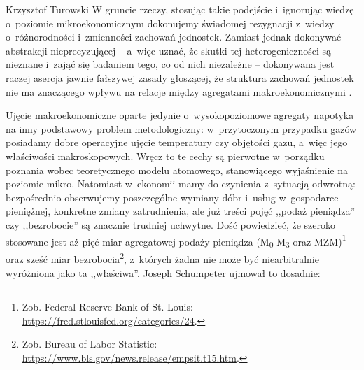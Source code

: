 \begin{artplenv}{Krzysztof Turowski}
W gruncie rzeczy, stosując takie podejście i~ignorując wiedzę o~poziomie mikroekonomicznym dokonujemy świadomej
rezygnacji z~wiedzy o~różnorodności i~zmienności zachowań jednostek. Zamiast jednak dokonywać abstrakcji
nieprecyzującej  --  a~więc uznać, że skutki tej heterogeniczności są nieznane i~zająć się badaniem tego, co od
nich niezależne  --  dokonywana jest raczej asercja jawnie fałszywej zasady głoszącej, że struktura zachowań
jednostek nie ma znaczącego wpływu na relacje między agregatami makroekonomicznymi
\parencite{long_realism_2006}.

Ujęcie makroekonomiczne oparte jedynie o~wysokopoziomowe agregaty napotyka na inny podstawowy problem
metodologiczny: w~przytoczonym przypadku gazów posiadamy dobre operacyjne ujęcie temperatury czy objętości
gazu, a~więc jego właściwości
makroskopowych. Wręcz to te cechy są pierwotne w~porządku poznania wobec teoretycznego modelu atomowego, stanowiącego
wyjaśnienie na poziomie mikro. Natomiast w~ekonomii mamy do czynienia z~sytuacją odwrotną: bezpośrednio obserwujemy
poszczególne wymiany dóbr i~usług w~gospodarce pieniężnej, konkretne zmiany zatrudnienia, ale już treści pojęć ,,podaż
pieniądza'' czy ,,bezrobocie'' są znacznie trudniej uchwytne. Dość powiedzieć, że szeroko stosowane jest aż pięć
miar agregatowej podaży pieniądza (M\textsubscript{0}{}-M\textsubscript{3} oraz MZM)\footnote{Zob. Federal Reserve Bank
of St. Louis: \url{https://fred.stlouisfed.org/categories/24}.} oraz sześć miar bezrobocia\footnote{Zob. Bureau of Labor
Statistic: \url{https://www.bls.gov/news.release/empsit.t15.htm}.}, z~których żadna nie może być niearbitralnie
wyróżniona jako ta ,,właściwa''. Joseph Schumpeter
\parencite*{schumpeter_nature_2010}
ujmował to dosadnie:



\end{artplenv}

